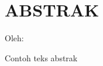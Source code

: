 \clearpage
\chapter*{ABSTRAK}
\begin{center}
    \center
    \begin{singlespace}
      \large\bfseries\MakeUppercase{\thetitle}
  
      \normalfont\normalsize
      Oleh:
  
      \bfseries \theauthor
    \end{singlespace}
\end{center} 

\begin{singlespace}
    \small
    Contoh teks abstrak
    


\end{singlespace}
